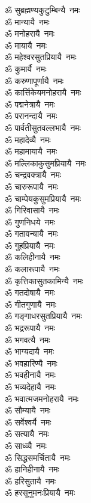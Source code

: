 \begin{flushleft}
\begin{multicols}{2}
ॐ सुब्रह्मण्यकुटुम्बिन्यै~नमः\\
ॐ मान्यायै~नमः\\
ॐ मनोहरायै~नमः\\
ॐ मायायै~नमः\\
ॐ महेश्वरसुतप्रियायै~नमः\\
ॐ कुमार्यै~नमः\\
ॐ करुणापूर्णायै~नमः\\
ॐ कार्त्तिकेयमनोहरायै~नमः\\
ॐ पद्मनेत्रायै~नमः\\
ॐ परानन्दायै~नमः\hfill{}\\
ॐ पार्वतीसुतवल्लभायै~नमः\\
ॐ महादेव्यै~नमः\\
ॐ महामायायै~नमः\\
ॐ मल्लिकाकुसुमप्रियायै~नमः\\
ॐ चन्द्रवक्त्रायै~नमः\\
ॐ चारुरूपायै~नमः\\
ॐ चाम्पेयकुसुमप्रियायै~नमः\\
ॐ गिरिवासायै~नमः\\
ॐ गुणनिधये~नमः\\
ॐ गतावन्यायै~नमः\hfill{}\\
ॐ गुहप्रियायै~नमः\\
ॐ कलिहीनायै~नमः\\
ॐ कलारूपायै~नमः\\
ॐ कृत्तिकासुतकामिन्यै~नमः\\
ॐ गतदोषायै~नमः\\
ॐ गीतगुणायै~नमः\\
ॐ गङ्गाधरसुतप्रियायै~नमः\\
ॐ भद्ररूपायै~नमः\\
ॐ भगवत्यै~नमः\\
ॐ भाग्यदायै~नमः\hfill{}\\
ॐ भवहारिण्यै~नमः\\
ॐ भवहीनायै~नमः\\
ॐ भव्यदेहायै~नमः\\
ॐ भवात्मजमनोहरायै~नमः\\
ॐ सौम्यायै~नमः\\
ॐ सर्वेश्वर्यै~नमः\\
ॐ सत्यायै~नमः\\
ॐ साध्व्यै~नमः\\
ॐ सिद्धसमर्चितायै~नमः\\
ॐ हानिहीनायै~नमः\hfill{}\\
ॐ हरिसुतायै~नमः\\
ॐ हरसूनुमनःप्रियायै~नमः\\

\end{multicols}
\end{flushleft}

